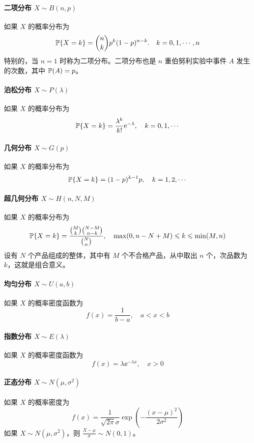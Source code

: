 \paragraph{二项分布 $X \sim B(n, p)$}
如果 $X$ 的概率分布为
\[ \mathbb{P}\{X = k\} = \binom{n}{k} p^k(1 - p)^{n-k}. \quad k = 0, 1, \cdots, n \]
特别的，当 $n=1$ 时称为二项分布。二项分布也是 $n$ 重伯努利实验中事件 $A$ 发生的次数，其中 $\mathbb{P}(A) = p$。

\paragraph{泊松分布 $X \sim P(\lambda)$}
如果 $X$ 的概率分布为
\[ \mathbb{P}\{X = k\} = \frac{\lambda^k}{k!} \mathrm{e}^{-\lambda} , \quad k = 0, 1, \cdots \]


\paragraph{几何分布 $X \sim G(p)$}
如果 $X$ 的概率分布为
\[ \mathbb{P}\{X=k\} = (1 - p)^{k-1}p, \quad k = 1, 2, \cdots \]

\paragraph{超几何分布 $X \sim H(n, N, M)$}
如果 $X$ 的概率分布为
\[ \mathbb{P}\{X = k\} = \frac{\binom{M}{k} \binom{N - M}{n - k}}{\binom{N}{n}}, \quad \max(0, n - N + M) \leqslant k \leqslant \min(M, n) \]
设有 $N$ 个产品组成的整体，其中有 $M$ 个不合格产品，从中取出 $n$ 个，次品数为 $k$，这就是组合意义。

\paragraph{均匀分布 $X \sim U(a, b)$}
如果 $X$ 的概率密度函数为
\[ f(x) = \frac{1}{b - a}, \quad a < x < b \]

\paragraph{指数分布 $X \sim E(\lambda)$}
如果 $X$ 的概率密度函数为
\[ f(x) = \lambda \ee^{-\lambda x}, \quad x > 0 \]

\paragraph{正态分布 $X \sim N(\mu, \sigma^2)$}
如果 $X$ 的概率密度为
\[ f(x) = \frac{1}{\sqrt{2 \pi}  \sigma} \exp \left(- \frac{(x - \mu)^2}{2\sigma^2}  \right) \]
如果 $X \sim N(\mu, \sigma^2)$，则 $\frac{X - \mu}{\sigma} \sim N(0, 1)$。


